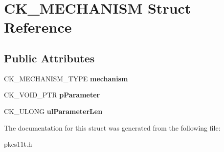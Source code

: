 \hypertarget{struct_c_k___m_e_c_h_a_n_i_s_m}{}\section{C\+K\+\_\+\+M\+E\+C\+H\+A\+N\+I\+SM Struct Reference}
\label{struct_c_k___m_e_c_h_a_n_i_s_m}
\subsection*{Public Attributes}
\begin{DoxyCompactItemize}
\item 
\mbox{\label{struct_c_k___m_e_c_h_a_n_i_s_m_a9184d5862b90646ed36cab61a9102d7a}} 
C\+K\+\_\+\+M\+E\+C\+H\+A\+N\+I\+S\+M\+\_\+\+T\+Y\+PE {\bfseries mechanism}
\item 
\mbox{\label{struct_c_k___m_e_c_h_a_n_i_s_m_a1653492fcd85698632f51f84596eb743}} 
C\+K\+\_\+\+V\+O\+I\+D\+\_\+\+P\+TR {\bfseries p\+Parameter}
\item 
\mbox{\label{struct_c_k___m_e_c_h_a_n_i_s_m_a47eeb17fc7cb3daac0e297c9af360798}} 
C\+K\+\_\+\+U\+L\+O\+NG {\bfseries ul\+Parameter\+Len}
\end{DoxyCompactItemize}


The documentation for this struct was generated from the following file\+:\begin{DoxyCompactItemize}
\item 
pkcs11t.\+h\end{DoxyCompactItemize}
